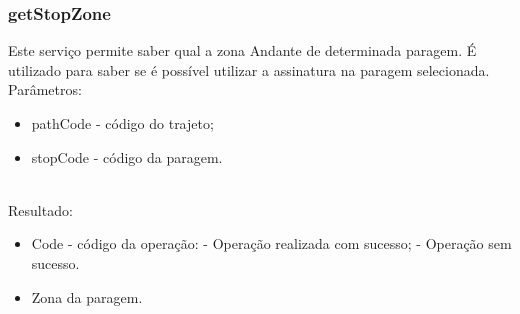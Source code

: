 \subsubsection{getStopZone}

Este serviço permite saber qual a zona Andante de determinada paragem. É utilizado para saber se é possível utilizar a assinatura na paragem selecionada.
\newline
~\\Parâmetros:
\begin{itemize}
\item pathCode - código do trajeto;
\item stopCode - código da paragem.
\end{itemize}

~\\Resultado:
\begin{itemize}
\item Code - código da operação:
 - Operação realizada com sucesso;
 - Operação sem sucesso.
\item Zona da paragem.
\end{itemize}